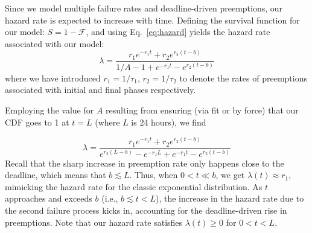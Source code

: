 Since we model multiple failure rates and deadline-driven preemptions, our hazard rate is expected to increase with time. Defining the survival function for our model: $S = 1 - \mathscr{F}$, and using Eq.~\ref{eq:hazard} yields the hazard rate associated with our model: 
\noindent 
\begin{equation}
  \label{eq:hmodel}
  \lambda %
  = \dfrac{r_1 e^{- r_1 t} + r_2 e^{r_2 (t - b)}}{1/A - 1 + e^{- r_1 t} - e^{r_2 (t - b)}}
\end{equation}
where we have introduced $r_1 = 1/\tau_1$, $r_2 = 1/\tau_2$ to denote the rates of preemptions associated with initial and final phases respectively.

Employing the value for $A$ resulting from ensuring (via fit or by force) that our CDF goes to 1 at $t = L$ (where $L$ is 24 hours), we find

\begin{equation}
  \label{eq:hmodel2}
  \lambda %
  = \dfrac{r_1 e^{- r_1 t} + r_2 e^{r_2 (t - b)}}{e^{r_2 (L - b)}  - e^{- r_1 L} + e^{- r_1 t} - e^{r_2 (t - b)} }
\end{equation}
Recall that the sharp increase in preemption rate only happens close to the deadline, which means that $b \lesssim L$. Thus, when $0 < t \ll b$, we get $\lambda(t) \approx r_1$, mimicking the hazard rate for the classic exponential distribution.
As $t$ approaches and exceeds $b$ (i.e., $b\lesssim t < L$), the increase in the hazard rate due to the second failure process kicks in, accounting for the deadline-driven rise in preemptions. Note that our hazard rate satisfies $\lambda(t) \ge 0$ for $0<t<L$.


